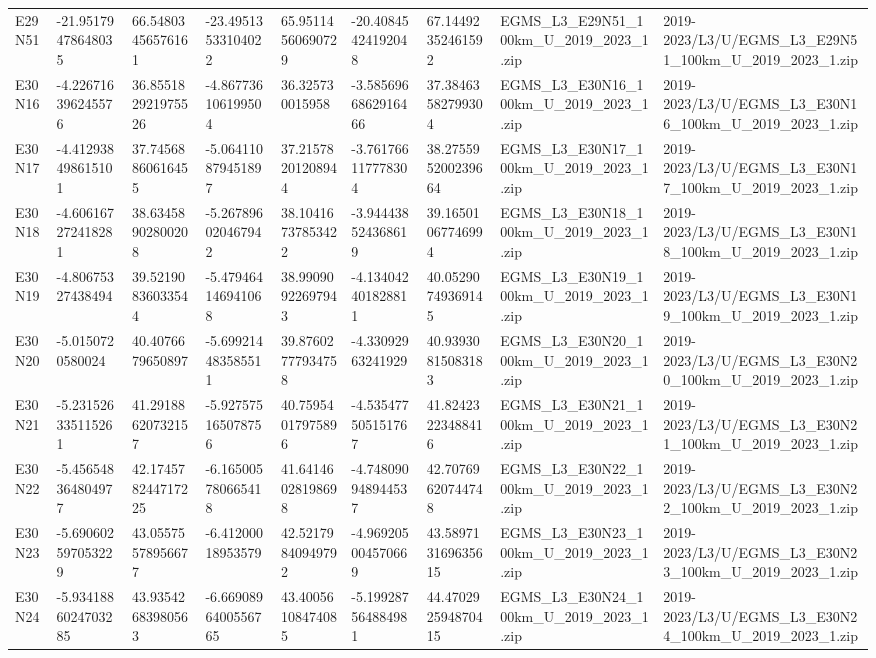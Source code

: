 \begin{landscape}
\begin{longtable}{lllllllll}
E29N51 & -21.95179478648035 & 66.54803456576161 & -23.49513533104022 & 65.95114560690729 & -20.40845424192048 & 67.14492352461592 & EGMS\_L3\_E29N51\_100km\_U\_2019\_2023\_1.zip & 2019-2023/L3/U/EGMS\_L3\_E29N51\_100km\_U\_2019\_2023\_1.zip \\
E30N16 & -4.226716396245576 & 36.855182921975526 & -4.867736106199504 & 36.325730015958 & -3.5856966862916466 & 37.38463582799304 & EGMS\_L3\_E30N16\_100km\_U\_2019\_2023\_1.zip & 2019-2023/L3/U/EGMS\_L3\_E30N16\_100km\_U\_2019\_2023\_1.zip \\
E30N17 & -4.412938498615101 & 37.74568860616455 & -5.064110879451897 & 37.21578201208944 & -3.761766117778304 & 38.275595200239664 & EGMS\_L3\_E30N17\_100km\_U\_2019\_2023\_1.zip & 2019-2023/L3/U/EGMS\_L3\_E30N17\_100km\_U\_2019\_2023\_1.zip \\
E30N18 & -4.606167272418281 & 38.63458902800208 & -5.267896020467942 & 38.10416737853422 & -3.944438524368619 & 39.16501067746994 & EGMS\_L3\_E30N18\_100km\_U\_2019\_2023\_1.zip & 2019-2023/L3/U/EGMS\_L3\_E30N18\_100km\_U\_2019\_2023\_1.zip \\
E30N19 & -4.80675327438494 & 39.52190836033544 & -5.479464146941068 & 38.99090922697943 & -4.134042401828811 & 40.05290749369145 & EGMS\_L3\_E30N19\_100km\_U\_2019\_2023\_1.zip & 2019-2023/L3/U/EGMS\_L3\_E30N19\_100km\_U\_2019\_2023\_1.zip \\
E30N20 & -5.0150720580024 & 40.4076679650897 & -5.699214483585511 & 39.87602777934758 & -4.33092963241929 & 40.93930815083183 & EGMS\_L3\_E30N20\_100km\_U\_2019\_2023\_1.zip & 2019-2023/L3/U/EGMS\_L3\_E30N20\_100km\_U\_2019\_2023\_1.zip \\
E30N21 & -5.231526335115261 & 41.29188620732157 & -5.927575165078756 & 40.75954017975896 & -4.535477505151767 & 41.82423223488416 & EGMS\_L3\_E30N21\_100km\_U\_2019\_2023\_1.zip & 2019-2023/L3/U/EGMS\_L3\_E30N21\_100km\_U\_2019\_2023\_1.zip \\
E30N22 & -5.456548364804977 & 42.174578244717225 & -6.165005780665418 & 41.64146028198698 & -4.748090948944537 & 42.70769620744748 & EGMS\_L3\_E30N22\_100km\_U\_2019\_2023\_1.zip & 2019-2023/L3/U/EGMS\_L3\_E30N22\_100km\_U\_2019\_2023\_1.zip \\
E30N23 & -5.690602597053229 & 43.05575578956677 & -6.41200018953579 & 42.52179840949792 & -4.969205004570669 & 43.589713169635615 & EGMS\_L3\_E30N23\_100km\_U\_2019\_2023\_1.zip & 2019-2023/L3/U/EGMS\_L3\_E30N23\_100km\_U\_2019\_2023\_1.zip \\
E30N24 & -5.9341886024703285 & 43.93542683980563 & -6.6690896400556765 & 43.40056108474085 & -5.199287564884981 & 44.470292594870415 & EGMS\_L3\_E30N24\_100km\_U\_2019\_2023\_1.zip & 2019-2023/L3/U/EGMS\_L3\_E30N24\_100km\_U\_2019\_2023\_1.zip \\

\end{longtable}
\end{landscape}

